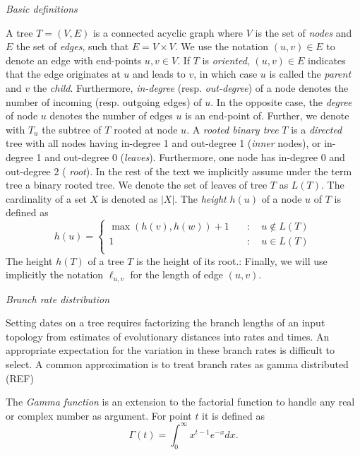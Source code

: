 \documentclass{llncs}
\renewcommand{\subsection}[1]{%
\bigskip
\begin{center}
\begin{large}
\normalfont\itshape #1
\end{large}
\end{center}}
\begin{document}
\subsection{Basic definitions}
%
A tree $T=(V,E)$ is a connected acyclic graph where $V$ is the set of {\em
nodes} and $E$ the set of {\em edges}, such that $E = V\times V$. We use the
notation $(u,v) \in E$ to denote an edge with end-points $u,v \in V$. If $T$ is
{\em oriented}, $(u,v) \in E$ indicates that the edge originates at $u$ and leads
to $v$, in which case $u$ is called the {\em parent} and $v$ the {\em child}.
Furthermore, {\em in-degree} (resp. {\em out-degree}) of a node denotes the
number of incoming (resp. outgoing edges) of $u$. In the opposite case, the
{\em degree} of node $u$ denotes the number of edges $u$ is an end-point of.
Further, we denote with $T_u$ the subtree of $T$ rooted at node $u$.  A {\em
rooted binary tree} $T$ is a {\em directed} tree with all nodes having
in-degree 1 and out-degree 1 ({\em inner} nodes), or in-degree 1 and out-degree
0 ({\em leaves}). Furthermore, one node has in-degree 0 and out-degree 2 ({\em
root}).  In the rest of the text we implicitly assume under the term tree a
binary rooted tree.  We denote the set of leaves of tree $T$ as $L(T)$.  The
cardinality of a set $X$ is denoted as $|X|$. The {\em height} $h(u)$ of a node
$u$ of $T$ is defined as 
%
\[ h(u) = \left\{ \begin{array}{ll}
\max(h(v), h(w)) + 1 & \quad : \quad u \notin L(T)\\
1                    & \quad : \quad u    \in L(T)\\
\end{array}\right. \] 
The height $h(T)$ of a tree $T$ is the height of its root.: Finally, we will
use implicitly the notation $\ell_{u,v}$ for the length of edge $(u,v)$.

\subsection{Branch rate distribution}
Setting dates on a tree requires factorizing the branch lengths of an input topology
from estimates of evolutionary distances into rates and times. 
An appropriate expectation for the variation in these branch rates is difficult to select.
A common approximation is to treat branch rates as gamma distributed (REF)

The {\em Gamma function} is an extension to the factorial function to handle
any real or complex number as argument. For point $t$ it is defined as
$$\Gamma(t) = \int_0^\infty x^{t-1} e^{-x} dx.$$
\end{document}
